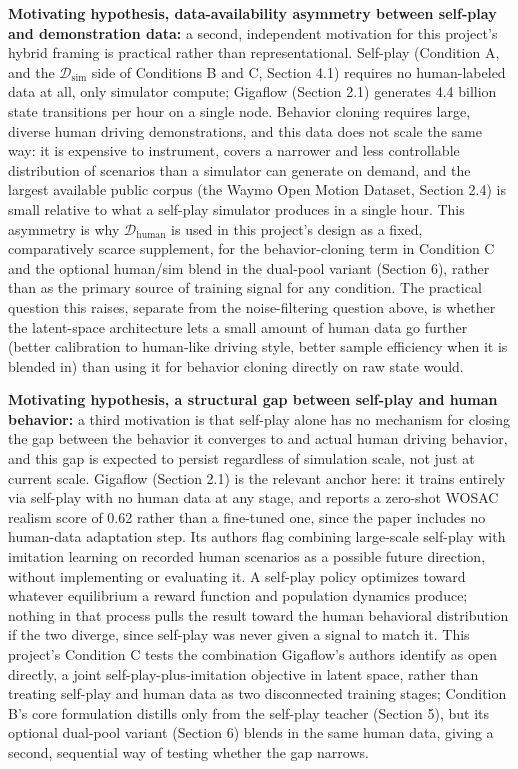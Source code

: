 \documentclass[11pt]{article}
\begin{document}
\textbf{Motivating hypothesis, data-availability asymmetry between self-play and demonstration data:} a second, independent motivation for this project's hybrid framing is practical rather than representational. Self-play (Condition A, and the \(\mathcal{D}_{\text{sim}}\) side of Conditions B and C, Section 4.1) requires no human-labeled data at all, only simulator compute; Gigaflow (Section 2.1) generates 4.4 billion state transitions per hour on a single node. Behavior cloning requires large, diverse human driving demonstrations, and this data does not scale the same way: it is expensive to instrument, covers a narrower and less controllable distribution of scenarios than a simulator can generate on demand, and the largest available public corpus (the Waymo Open Motion Dataset, Section 2.4) is small relative to what a self-play simulator produces in a single hour. This asymmetry is why \(\mathcal{D}_{\text{human}}\) is used in this project's design as a fixed, comparatively scarce supplement, for the behavior-cloning term in Condition C and the optional human/sim blend in the dual-pool variant (Section 6), rather than as the primary source of training signal for any condition. The practical question this raises, separate from the noise-filtering question above, is whether the latent-space architecture lets a small amount of human data go further (better calibration to human-like driving style, better sample efficiency when it is blended in) than using it for behavior cloning directly on raw state would.

\textbf{Motivating hypothesis, a structural gap between self-play and human behavior:} a third motivation is that self-play alone has no mechanism for closing the gap between the behavior it converges to and actual human driving behavior, and this gap is expected to persist regardless of simulation scale, not just at current scale. Gigaflow (Section 2.1) is the relevant anchor here: it trains entirely via self-play with no human data at any stage, and reports a zero-shot WOSAC realism score of 0.62 rather than a fine-tuned one, since the paper includes no human-data adaptation step. Its authors flag combining large-scale self-play with imitation learning on recorded human scenarios as a possible future direction, without implementing or evaluating it. A self-play policy optimizes toward whatever equilibrium a reward function and population dynamics produce; nothing in that process pulls the result toward the human behavioral distribution if the two diverge, since self-play was never given a signal to match it. This project's Condition C tests the combination Gigaflow's authors identify as open directly, a joint self-play-plus-imitation objective in latent space, rather than treating self-play and human data as two disconnected training stages; Condition B's core formulation distills only from the self-play teacher (Section 5), but its optional dual-pool variant (Section 6) blends in the same human data, giving a second, sequential way of testing whether the gap narrows.
\end{document}
